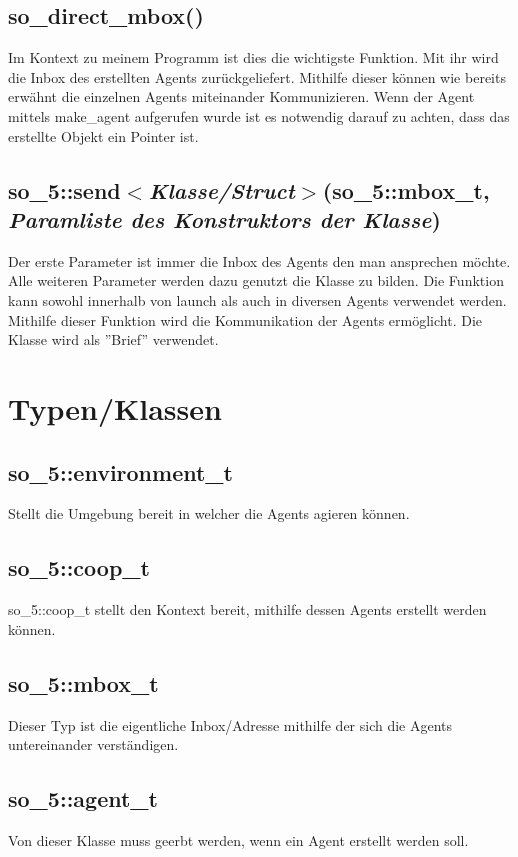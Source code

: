 \subsection{so\_direct\_mbox()}
Im Kontext zu meinem Programm ist dies die wichtigste Funktion. Mit ihr wird die Inbox des erstellten Agents
zurückgeliefert. Mithilfe dieser können wie bereits erwähnt die einzelnen Agents miteinander Kommunizieren.
Wenn der Agent mittels make\_agent aufgerufen wurde ist es notwendig darauf zu achten, dass das erstellte Objekt
ein Pointer ist.

\subsection{so\_5::send$<$\textit{Klasse/Struct}$>$(so\_5::mbox\_t, \textit{Paramliste des Konstruktors der Klasse})}
Der erste Parameter ist immer die Inbox des Agents den man ansprechen möchte. Alle weiteren Parameter werden
dazu genutzt die Klasse zu bilden. Die Funktion kann sowohl innerhalb von launch als auch in diversen Agents
verwendet werden. Mithilfe dieser Funktion wird die Kommunikation der Agents ermöglicht. Die Klasse wird als
''Brief'' verwendet.

\section{Typen/Klassen}

\subsection{so\_5::environment\_t}
Stellt die Umgebung bereit in welcher die Agents agieren können.

\subsection{so\_5::coop\_t}
so\_5::coop\_t stellt den Kontext bereit, mithilfe dessen Agents erstellt werden können.

\subsection{so\_5::mbox\_t}
Dieser Typ ist die eigentliche Inbox/Adresse mithilfe der sich die Agents untereinander verständigen.

\subsection{so\_5::agent\_t}
Von dieser Klasse muss geerbt werden, wenn ein Agent erstellt werden soll.

